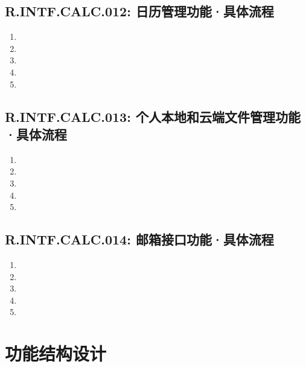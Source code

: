     \subsection{R.INTF.CALC.012: 日历管理功能·具体流程}
    \begin{enumerate}
        \item 
        \item 
        \item 
        \item 
        \item 
    \end{enumerate}
    \subsection{R.INTF.CALC.013: 个人本地和云端文件管理功能·具体流程}
    \begin{enumerate}
        \item 
        \item 
        \item 
        \item 
        \item 
    \end{enumerate}
    \subsection{R.INTF.CALC.014: 邮箱接口功能·具体流程}
    \begin{enumerate}
        \item 
        \item 
        \item 
        \item 
        \item 
    \end{enumerate}
\section{功能结构设计}
